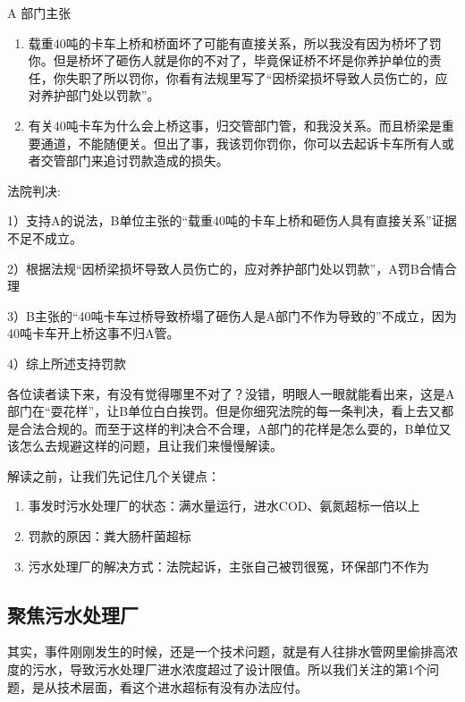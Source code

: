 \documentclass[]{book}
\begin{document}
A 部门主张

\begin{enumerate}
\def\labelenumi{\arabic{enumi}.}
\item
  载重40吨的卡车上桥和桥面坏了可能有直接关系，所以我没有因为桥坏了罚你。但是桥坏了砸伤人就是你的不对了，毕竟保证桥不坏是你养护单位的责任，你失职了所以罚你，你看有法规里写了``因桥梁损坏导致人员伤亡的，应对养护部门处以罚款''。
\item
  有关40吨卡车为什么会上桥这事，归交管部门管，和我没关系。而且桥梁是重要通道，不能随便关。但出了事，我该罚你罚你，你可以去起诉卡车所有人或者交管部门来追讨罚款造成的损失。
\end{enumerate}

法院判决:

1）支持A的说法，B单位主张的``载重40吨的卡车上桥和砸伤人具有直接关系''证据不足不成立。

2）根据法规``因桥梁损坏导致人员伤亡的，应对养护部门处以罚款''，A罚B合情合理

3）B主张的``40吨卡车过桥导致桥塌了砸伤人是A部门不作为导致的''不成立，因为40吨卡车开上桥这事不归A管。

4）综上所述支持罚款

各位读者读下来，有没有觉得哪里不对了？没错，明眼人一眼就能看出来，这是A部门在``耍花样''，让B单位白白挨罚。但是你细究法院的每一条判决，看上去又都是合法合规的。而至于这样的判决合不合理，A部门的花样是怎么耍的，B单位又该怎么去规避这样的问题，且让我们来慢慢解读。

解读之前，让我们先记住几个关键点：

\begin{enumerate}
\def\labelenumi{\arabic{enumi}.}
\item
  事发时污水处理厂的状态：满水量运行，进水COD、氨氮超标一倍以上
\item
  罚款的原因：粪大肠杆菌超标
\item
  污水处理厂的解决方式：法院起诉，主张自己被罚很冤，环保部门不作为
\end{enumerate}

\hypertarget{ux805aux7126ux6c61ux6c34ux5904ux7406ux5382}{%
\subsection{聚焦污水处理厂}\label{ux805aux7126ux6c61ux6c34ux5904ux7406ux5382}}

其实，事件刚刚发生的时候，还是一个技术问题，就是有人往排水管网里偷排高浓度的污水，导致污水处理厂进水浓度超过了设计限值。所以我们关注的第1个问题，是从技术层面，看这个进水超标有没有办法应付。
\end{document}
